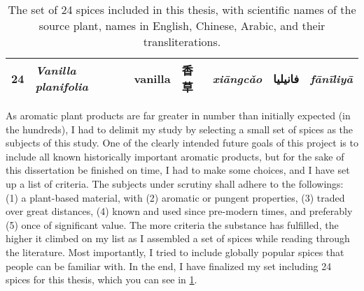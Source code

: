 \begin{table}[ht]
\begin{tabularx}{\textwidth}{@{}r>{\footnotesize}llll@{}rl@{}}
24          & \textit{Vanilla planifolia}        & vanilla          & 香草               & \textit{xiāngcǎo}        & فانيليا         & \textit{fānīliyā}\\ 
\bottomrule
\end{tabularx}
\caption[The set of 24 spices included in this thesis.]{The set of 24 spices included in this thesis, with scientific names of the source plant, names in English, Chinese, Arabic, and their transliterations.}
\label{table:set}
\end{table}

\setlength{\tabcolsep}{6pt}


As aromatic plant products are far greater in number than initially expected (in the hundreds), I had to delimit my study by selecting a small set of spices as the subjects of this study. One of the clearly intended future goals of this project is to include all known historically important aromatic products, but for the sake of this dissertation be finished on time, I had to make some choices, and I have set up a list of criteria. The subjects under scrutiny shall adhere to the followings: (1) a plant-based material, with (2) aromatic or pungent properties, (3) traded over great distances, (4) known and used since pre-modern times, and preferably (5) once of significant value. The more criteria the substance has fulfilled, the higher it climbed on my list as I assembled a set of spices while reading through the literature. Most importantly, I tried to include globally popular spices that people can be familiar with. In the end, I have finalized my set including 24 spices for this thesis, which you can see in \cref{table:set}. 

